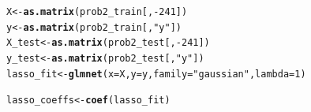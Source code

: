\documentclass[11pt, a4paper, english]{article}\usepackage[]{graphicx}\usepackage[dvipsnames]{xcolor}
\makeatletter
\newcommand{\hlnum}[1]{\textcolor[rgb]{0.686,0.059,0.569}{#1}}%
\newcommand{\hlstr}[1]{\textcolor[rgb]{0.192,0.494,0.8}{#1}}%
\newcommand{\hlopt}[1]{\textcolor[rgb]{0,0,0}{#1}}%
\newcommand{\hlstd}[1]{\textcolor[rgb]{0.345,0.345,0.345}{#1}}%
\newcommand{\hlkwb}[1]{\textcolor[rgb]{0.69,0.353,0.396}{#1}}%
\newcommand{\hlkwc}[1]{\textcolor[rgb]{0.333,0.667,0.333}{#1}}%
\newcommand{\hlkwd}[1]{\textcolor[rgb]{0.737,0.353,0.396}{\textbf{#1}}}%
\newenvironment{kframe}{%
 \def\at@end@of@kframe{}%
 \ifinner\ifhmode%
  \def\at@end@of@kframe{\end{minipage}}%
  \begin{minipage}{\columnwidth}%
 \fi\fi%
 \def\FrameCommand##1{\hskip\@totalleftmargin \hskip-\fboxsep
 \colorbox{shadecolor}{##1}\hskip-\fboxsep
     \hskip-\linewidth \hskip-\@totalleftmargin \hskip\columnwidth}%
 \MakeFramed {\advance\hsize-\width
   \@totalleftmargin\z@ \linewidth\hsize
   \@setminipage}}%
 {\par\unskip\endMakeFramed%
 \at@end@of@kframe}
\newenvironment{knitrout}{}{} %
\makeatother
\begin{document}
\begin{knitrout}
\color{fgcolor}\begin{kframe}
\begin{alltt}
\hlstd{X} \hlkwb{<-} \hlkwd{as.matrix}\hlstd{(prob2_train[,} \hlopt{-}\hlnum{241}\hlstd{])}
\hlstd{y} \hlkwb{<-} \hlkwd{as.matrix}\hlstd{(prob2_train[,} \hlstr{"y"}\hlstd{])}
\hlstd{X_test} \hlkwb{<-} \hlkwd{as.matrix}\hlstd{(prob2_test[,} \hlopt{-}\hlnum{241}\hlstd{])}
\hlstd{y_test} \hlkwb{<-} \hlkwd{as.matrix}\hlstd{(prob2_test[,} \hlstr{"y"}\hlstd{])}
\hlstd{lasso_fit} \hlkwb{<-} \hlkwd{glmnet}\hlstd{(}\hlkwc{x}\hlstd{=X,} \hlkwc{y}\hlstd{=y,} \hlkwc{family} \hlstd{=} \hlstr{"gaussian"}\hlstd{,} \hlkwc{lambda}\hlstd{=}\hlnum{1}\hlstd{)}

\hlstd{lasso_coeffs} \hlkwb{<-} \hlkwd{coef}\hlstd{(lasso_fit)}
\end{alltt}
\end{kframe}
\end{knitrout}
\end{document}

